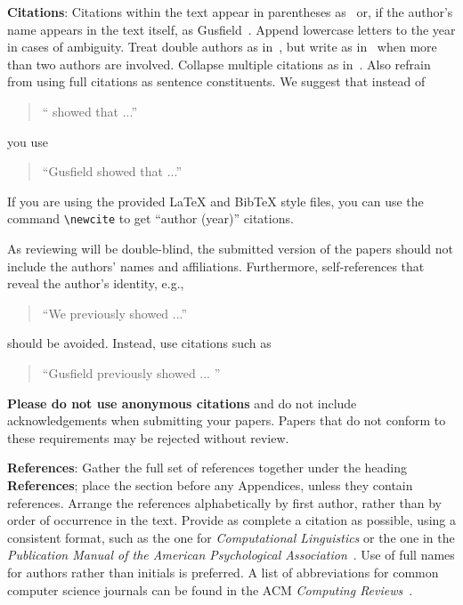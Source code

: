 \documentclass[11pt]{article}
\begin{document}
{\bf Citations}: Citations within the text appear in parentheses
as~\cite{Gusfield:97} or, if the author's name appears in the text
itself, as Gusfield~.  Append lowercase letters
to the year in cases of ambiguity.  Treat double authors as
in~\cite{Aho:72}, but write as in~\cite{Chandra:81} when more than two
authors are involved. Collapse multiple citations as
in~\cite{Gusfield:97,Aho:72}. Also refrain from using full citations
as sentence constituents. We suggest that instead of
\begin{quote}
  ``\cite{Gusfield:97} showed that ...''
\end{quote}
you use
\begin{quote}
``Gusfield    showed that ...''
\end{quote}

If you are using the provided \LaTeX{} and Bib\TeX{} style files, you
can use the command \verb|\newcite| to get ``author (year)'' citations.

As reviewing will be double-blind, the submitted version of the papers
should not include the authors' names and affiliations. Furthermore,
self-references that reveal the author's identity, e.g.,
\begin{quote}
``We previously showed \cite{Gusfield:97} ...''  
\end{quote}
should be avoided. Instead, use citations such as 
\begin{quote}
``Gusfield 
previously showed ... ''
\end{quote}

\textbf{Please do not use anonymous citations} and do not include
acknowledgements when submitting your papers. Papers that do not
conform to these requirements may be rejected without review.

\textbf{References}: Gather the full set of references together under
the heading {\bf References}; place the section before any Appendices,
unless they contain references. Arrange the references alphabetically
by first author, rather than by order of occurrence in the text.
Provide as complete a citation as possible, using a consistent format,
such as the one for {\em Computational Linguistics\/} or the one in the 
{\em Publication Manual of the American 
Psychological Association\/}~\cite{APA:83}.  Use of full names for
authors rather than initials is preferred.  A list of abbreviations
for common computer science journals can be found in the ACM 
{\em Computing Reviews\/}~\cite{ACM:83}.
\end{document}
